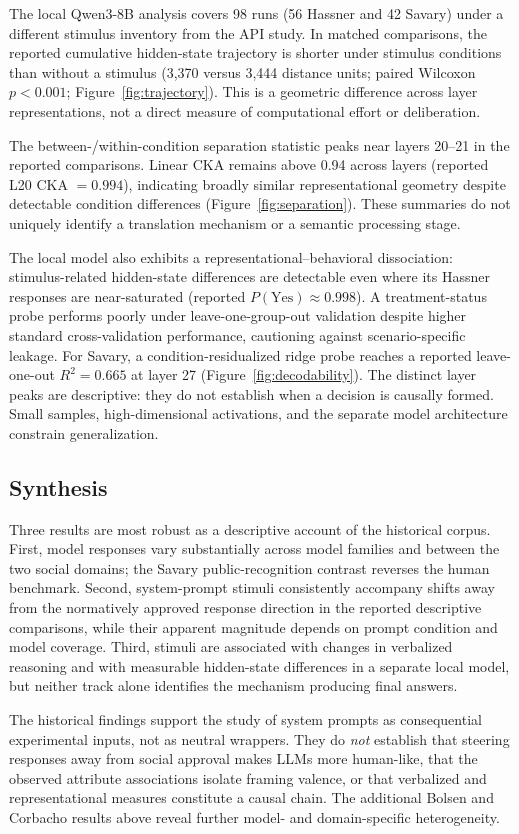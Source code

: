 The local Qwen3-8B analysis covers 98 runs (56 Hassner and 42 Savary) under a different stimulus inventory from the API study. In matched comparisons, the reported cumulative hidden-state trajectory is shorter under stimulus conditions than without a stimulus (3{,}370 versus 3{,}444 distance units; paired Wilcoxon $p<0.001$; Figure~\ref{fig:trajectory}). This is a geometric difference across layer representations, not a direct measure of computational effort or deliberation.

The between-/within-condition separation statistic peaks near layers 20--21 in the reported comparisons. Linear CKA remains above 0.94 across layers (reported L20 CKA $=0.994$), indicating broadly similar representational geometry despite detectable condition differences (Figure~\ref{fig:separation}). These summaries do not uniquely identify a translation mechanism or a semantic processing stage.

The local model also exhibits a representational--behavioral dissociation: stimulus-related hidden-state differences are detectable even where its Hassner responses are near-saturated (reported $P(\mathrm{Yes})\approx0.998$). A treatment-status probe performs poorly under leave-one-group-out validation despite higher standard cross-validation performance, cautioning against scenario-specific leakage. For Savary, a condition-residualized ridge probe reaches a reported leave-one-out $R^2=0.665$ at layer 27 (Figure~\ref{fig:decodability}). The distinct layer peaks are descriptive: they do not establish when a decision is causally formed. Small samples, high-dimensional activations, and the separate model architecture constrain generalization.

\subsection{Synthesis}

Three results are most robust as a descriptive account of the historical corpus. First, model responses vary substantially across model families and between the two social domains; the Savary public-recognition contrast reverses the human benchmark. Second, system-prompt stimuli consistently accompany shifts away from the normatively approved response direction in the reported descriptive comparisons, while their apparent magnitude depends on prompt condition and model coverage. Third, stimuli are associated with changes in verbalized reasoning and with measurable hidden-state differences in a separate local model, but neither track alone identifies the mechanism producing final answers.

The historical findings support the study of system prompts as consequential experimental inputs, not as neutral wrappers. They do \emph{not} establish that steering responses away from social approval makes LLMs more human-like, that the observed attribute associations isolate framing valence, or that verbalized and representational measures constitute a causal chain. The additional Bolsen and Corbacho results above reveal further model- and domain-specific heterogeneity.
